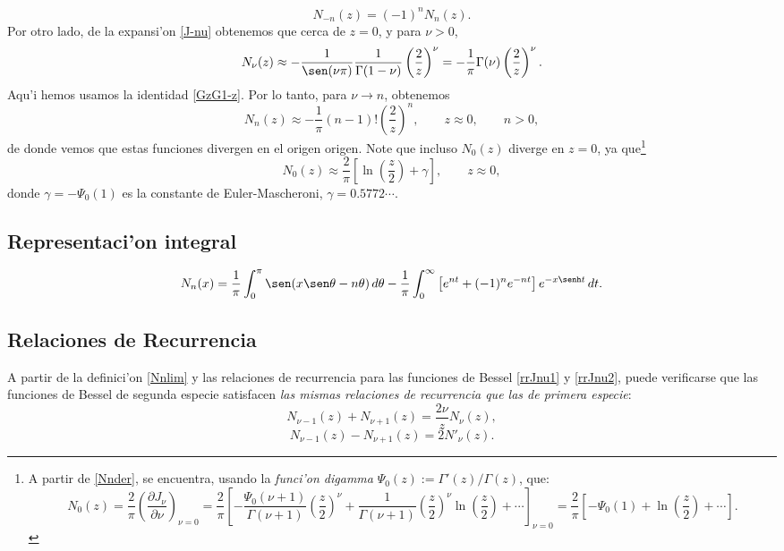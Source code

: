 \begin{equation}
\boxed{N_{-n}(z)=(-1)^nN_n(z).}
\end{equation}
Por otro lado, de la expansi'on \eqref{J-nu} obtenemos que cerca de $z=0$, y para $\nu>0$,
\begin{equation}
N_\nu(z)\approx -\frac{1}{\sen(\nu\pi)}\frac{1}{\Gamma(1-\nu)}\left(\frac{2}{z}\right)^\nu=-\frac{1}{\pi}\Gamma{(\nu)}\left(\frac{2}{z}\right)^\nu.
\end{equation}
Aqu'i hemos usamos la identidad \eqref{GzG1-z}. Por lo tanto, para $\nu\to n$, obtenemos
\begin{equation}
N_n(z)\approx -\frac{1}{\pi}(n-1)!\left(\frac{2}{z}\right)^n, \qquad z\approx 0, \qquad n>0,
\end{equation}
de donde vemos que estas funciones divergen en el origen origen. Note que incluso $N_0(z)$ diverge en $z=0$, ya que\footnote{A partir de \eqref{Nnder}, se encuentra, usando la \textit{funci'on  digamma} $\Psi_0(z):=\Gamma'(z)/\Gamma(z)$, que: \begin{equation}
N_0(z)=\frac{2}{\pi}\left(\frac{\partial J_\nu}{\partial\nu}\right)_{\nu=0}=\frac{2}{\pi}\left[-\frac{\Psi_0(\nu+1)}{\Gamma(\nu+1)}\left(\frac{z}{2}\right)^\nu+\frac{1}{\Gamma(\nu+1)}\left(\frac{z}{2}\right)^\nu\ln\left(\frac{z}{2}\right)+\cdots\right]_{\nu=0}=\frac{2}{\pi}\left[-\Psi_0(1)+\ln\left(\frac{z}{2}\right)+\cdots\right].
\end{equation}}  
\begin{equation}
N_0(z)\approx \frac{2}{\pi}\left[\ln\left(\frac{z}{2}\right) + \gamma \right], \qquad z\approx 0,	
\end{equation}
donde $\gamma=-\Psi_0(1)$ es la constante de Euler-Mascheroni, $\gamma=0.5772\cdots$.


\subsection{Representaci'on integral}
\begin{equation}
N_n(x) =\frac{1}{\pi} \int_0^\pi \sen(x \sen\theta - n\theta) \, d\theta
- \frac{1}{\pi} \int_0^\infty\left[ e^{n t} + (-1)^n e^{-n t} \right]
 e^{-x \senh t} \, dt.
\end{equation}


\subsection{Relaciones de Recurrencia}
A partir de la definici'on \eqref{Nnlim} y las relaciones de recurrencia para las funciones de Bessel \eqref{rrJnu1} y \eqref{rrJnu2}, puede verificarse que las funciones de Bessel de segunda especie satisfacen \textit{las mismas relaciones de recurrencia que las de primera especie}:
\begin{equation}\label{rrNnu1}
N_{\nu-1}(z)+N_{\nu+1}(z)=\frac{2\nu}{z}N_\nu(z),
\end{equation}
\begin{equation}\label{rrNnu2}
N_{\nu-1}(z)-N_{\nu+1}(z)=2N'_\nu(z).
\end{equation}



